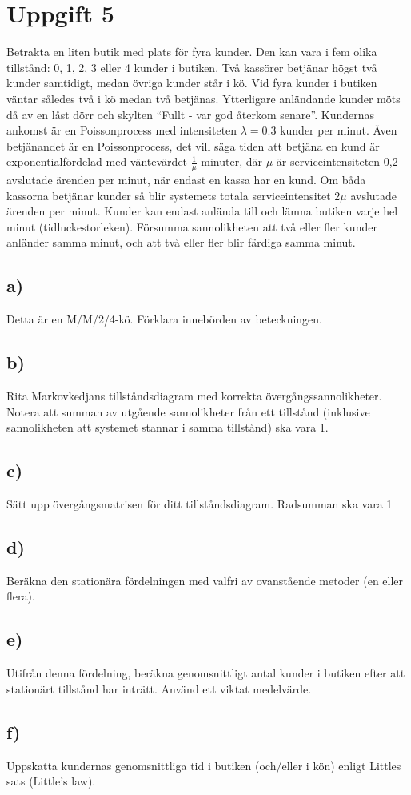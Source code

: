 \documentclass[a4paper]{article}
\begin{document}
\section{Uppgift 5}
Betrakta en liten butik med plats för fyra kunder. Den kan vara i fem olika tillstånd: 0, 1, 2, 3
eller 4 kunder i butiken. Två kassörer betjänar högst två kunder samtidigt, medan övriga
kunder står i kö. Vid fyra kunder i butiken väntar således två i kö medan två betjänas.
Ytterligare anländande kunder möts då av en låst dörr och skylten ``Fullt - var god återkom
senare''. Kundernas ankomst är en Poissonprocess med intensiteten \( \lambda =0.3\) kunder per minut.
Även betjänandet är en Poissonprocess, det vill säga tiden att betjäna en kund är
exponentialfördelad med väntevärdet \( \frac{1}{\mu} \) minuter, där \( \mu \) är serviceintensiteten 0,2 avslutade
ärenden per minut, när endast en kassa har en kund. Om båda kassorna betjänar kunder så
blir systemets totala serviceintensitet \( 2\mu  \) avslutade ärenden per minut. Kunder kan endast
anlända till och lämna butiken varje hel minut (tidluckestorleken). Försumma sannolikheten
att två eller fler kunder anländer samma minut, och att två eller fler blir färdiga samma minut.

\subsection{a)}
Detta är en M/M/2/4-kö. Förklara innebörden av beteckningen.

\subsection{b)}
Rita Markovkedjans tillståndsdiagram med korrekta övergångssannolikheter. Notera
att summan av utgående sannolikheter från ett tillstånd (inklusive sannolikheten att
systemet stannar i samma tillstånd) ska vara 1.

\subsection{c)}
Sätt upp övergångsmatrisen för ditt tillståndsdiagram. Radsumman ska vara 1

\subsection{d)}
Beräkna den stationära fördelningen med valfri av ovanstående metoder (en eller
flera).

\subsection{e)}
Utifrån denna fördelning, beräkna genomsnittligt antal kunder i butiken efter att
stationärt tillstånd har inträtt. Använd ett viktat medelvärde.

\subsection{f)}
Uppskatta kundernas genomsnittliga tid i butiken (och/eller i kön) enligt Littles sats
(Little's law).
\end{document}
